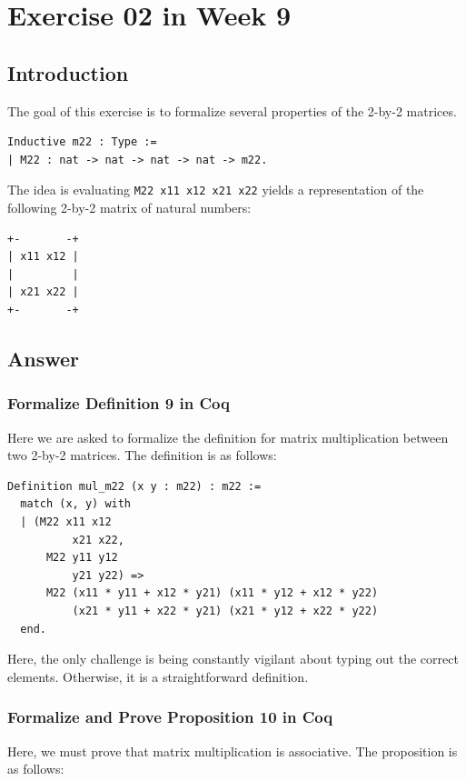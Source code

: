 \documentclass{article}
\begin{document}
 
\section{Exercise 02 in Week 9}

\subsection{Introduction}

The goal of this exercise is to formalize several properties of the 2-by-2 matrices. 

\begin{lstlisting}
Inductive m22 : Type :=
| M22 : nat -> nat -> nat -> nat -> m22.
\end{lstlisting}

The idea is evaluating \texttt{M22 x11 x12 x21 x22} yields a representation of the following 2-by-2 matrix of natural numbers:

\begin{lstlisting}
+-       -+
| x11 x12 |
|         |
| x21 x22 |
+-       -+
\end{lstlisting}

\subsection{Answer}

\subsubsection{Formalize Definition 9 in Coq}

Here we are asked to formalize the definition for matrix multiplication between two 2-by-2 matrices. The definition is as follows:
\begin{lstlisting}
Definition mul_m22 (x y : m22) : m22 :=
  match (x, y) with
  | (M22 x11 x12
          x21 x22,
      M22 y11 y12
          y21 y22) =>
      M22 (x11 * y11 + x12 * y21) (x11 * y12 + x12 * y22)
          (x21 * y11 + x22 * y21) (x21 * y12 + x22 * y22)
  end.
\end{lstlisting}

Here, the only challenge is being constantly vigilant about typing out the correct elements. Otherwise, it is a straightforward definition.

\subsubsection{Formalize and Prove Proposition 10 in Coq}
Here, we must prove that matrix multiplication is associative. The proposition is as follows:
\end{document}
